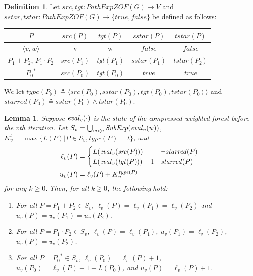 \documentclass{article}
\newcommand{\tuple}[1]{\langle #1 \rangle}
\newcommand{\pathexpzofree}[1]{\mathit{PathExpZOF}(#1)} %
\newcommand{\subexp}[1]{\mathit{SubExp}(#1)}
\newcommand{\defeq}{\triangleq}
\newcommand{\false}{\mathit{false}}
\newcommand{\true}{\mathit{true}}
\newcommand{\eval}[2][]{
  \ifthenelse{ \equal{#1}{} }
  {\mathit{eval}(#2)}
  {\mathit{eval}_{#1}(#2)}
}
\newcommand{\src}[1]{\mathit{src}(#1)}
\newcommand{\tgt}[1]{\mathit{tgt}(#1)}
\newcommand{\sstar}[1]{\mathit{sstar}(#1)}
\newcommand{\tstar}[1]{\mathit{tstar}(#1)}
\newcommand{\starred}[1]{\mathit{starred}(#1)}
\newcommand{\type}[1]{\mathit{type}(#1)}
\newtheorem{lemma}{Lemma}
\theoremstyle{definition}
\newtheorem{definition}{Definition}
\begin{document}
\begin{definition}
  Let $\mathit{src}, \mathit{tgt}: \pathexpzofree{G} \to V$ and
  $\mathit{sstar}, \mathit{tstar}: \pathexpzofree{G} \to \{\true,
  \false\}$ be defined as follows:

  \begin{center}
    \begin{tabular}{| c | c | c | c | c |}
      \hline
      $P$ & $\src{P}$ & $\tgt{P}$ & $\sstar{P}$ & $\tstar{P}$ \\
      \hline
      $\tuple{v, w}$ & v & w & $\false$ & $\false$ \\
      $P_1 + P_2$, $P_1 \cdot P_2$ & $\src{P_1}$ & $\tgt{P_1}$ & $\sstar{P_1}$ & $\tstar{P_2}$ \\
      ${P_0}^*$ & $\src{P_0}$ & $\tgt{P_0}$ & $\true$ & $\true$ \\
      \hline
    \end{tabular}
  \end{center}

  We let
  $\type{P_0} \defeq \tuple{\src{P_0}, \sstar{P_0}, \tgt{P_0},
    \tstar{P_0}}$ and
  $\starred{P_0} \defeq \sstar{P_0} \land \tstar{P_0}$.
\end{definition}

\begin{lemma}
  Suppose $\eval[v]{\cdot}$ is the state of the compressed
  weighted forest before the $v$th iteration. Let
  $S_v = \bigcup_{w < v} \subexp{\eval[v]{w}}$,
  $K_v^t = \max\{L(P)|P \in S_v, \type{P} = t\}$, and
  \begin{align*}
    \ell_v(P)
    &= \begin{cases}
      L(\eval[v]{\src{P}}) & \neg \starred{P} \\
      L(\eval[v]{\tgt{P}}) - 1 & \starred{P}
    \end{cases} \\
    u_v(P) &= \ell_v(P) + K_v^{\type{P}}
  \end{align*}
  for any $k \ge 0$. Then, for all $k \ge 0$, the following hold:

  \begin{enumerate}
  \item For all $P = P_1 + P_2 \in S_v$,
    $\ell_v(P) = \ell_v(P_1) = \ell_v(P_2)$ and
    $u_v(P) = u_v(P_1) = u_v(P_2)$.
  \item For all $P = P_1 \cdot P_2 \in S_v$,
    $\ell_v(P) = \ell_v(P_1)$, $u_v(P_1) = \ell_v(P_2)$,
    $u_v(P) = u_v(P_2)$.
  \item For all $P = {P_0}^* \in S_v$,
    $\ell_v(P_0) = \ell_v(P) + 1$, $u_v(P_0) = \ell_v(P) + 1 +
    L(P_0)$, and $u_v(P) = \ell_v(P) + 1$.
  \end{enumerate}
\end{lemma}
\end{document}
